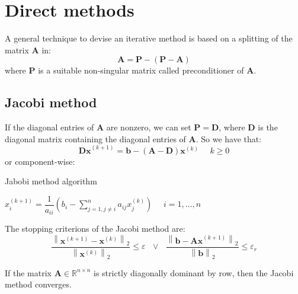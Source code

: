 \documentclass[12pt, a4paper]{report}
\newtheorem[style=M,bodystyle=\normalfont]{theorem}{Theorem}
\newtheorem[style=M,bodystyle=\normalfont]{proposition}{Proposition}
\newtheorem[style=M,bodystyle=\normalfont]{corollary}{Corollary}
\newtheorem[style=M,bodystyle=\normalfont]{lemma}{Lemma}
\newtheorem[style=M,bodystyle=\normalfont]{definition}{Definition}
\begin{document}
    \section{Direct methods}
    A general technique to devise an iterative method is based on a splitting of the matrix $\boldsymbol{A}$ in: 
    \[\boldsymbol{A}=\boldsymbol{P}-\left(\boldsymbol{P}-\boldsymbol{A}\right)\]
    where $\boldsymbol{P}$ is a suitable non-singular matrix called preconditioner of $\boldsymbol{A}$. 

    \subsection{Jacobi method}
    If the diagonal entries of $\boldsymbol{A}$ are nonzero, we can set $\boldsymbol{P}=\boldsymbol{D}$, where $\boldsymbol{D}$ is the diagonal matrix containing the diagonal 
    entries of $\boldsymbol{A}$. So we have that: 
    \[\boldsymbol{Dx}^{(k+1)}=\boldsymbol{b}-\left( \boldsymbol{A}-\boldsymbol{D} \right)\boldsymbol{x}^{(k)} \:\:\:\:\:\: k \geq 0\]
    or component-wise: 
    \begin{algorithm}[H]
        \caption{Jabobi method algorithm}
            \begin{algorithmic}[1]
                \State $x_i^{(k+1)}=\dfrac{1}{a_{ii}}\left( b_i-\sum_{j=1,j \neq i}^{n}a_{ij}x_j^{(k)}\right) \:\:\:\:\:\: i=1,\dots,n $
            \end{algorithmic}
    \end{algorithm}
    The stopping criterions of the Jacobi method are: 
    \[\dfrac{\left\lVert \boldsymbol{x}^{(k+1)}-\boldsymbol{x}^{(k)} \right\rVert_2}{\left\lVert \boldsymbol{x}^{(k)} \right\rVert_2} \leq \varepsilon \:\:\: \lor \:\:\: \dfrac{\left\lVert \boldsymbol{b}-\boldsymbol{Ax}^{(k+1)} \right\rVert_2}{\left\lVert \boldsymbol{b} \right\rVert_2} \leq \varepsilon_r\]
    \begin{proposition}
        If the matrix $\boldsymbol{A} \in \mathbb{R}^{n \times n}$ is strictly diagonally dominant by row, then the Jacobi method converges. 
    \end{proposition}
\end{document}
